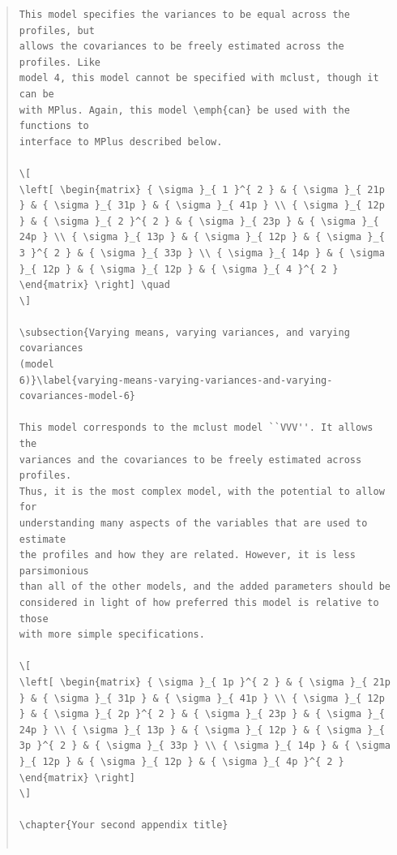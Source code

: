 \documentclass[]{msu-thesis}
\theoremstyle{definition}
\theoremstyle{definition}
\theoremstyle{definition}
\theoremstyle{remark}
\begin{document}
\begin{quote}
\begin{lstlisting}
This model specifies the variances to be equal across the profiles, but
allows the covariances to be freely estimated across the profiles. Like
model 4, this model cannot be specified with mclust, though it can be
with MPlus. Again, this model \emph{can} be used with the functions to
interface to MPlus described below.

\[
\left[ \begin{matrix} { \sigma }_{ 1 }^{ 2 } & { \sigma }_{ 21p } & { \sigma }_{ 31p } & { \sigma }_{ 41p } \\ { \sigma }_{ 12p } & { \sigma }_{ 2 }^{ 2 } & { \sigma }_{ 23p } & { \sigma }_{ 24p } \\ { \sigma }_{ 13p } & { \sigma }_{ 12p } & { \sigma }_{ 3 }^{ 2 } & { \sigma }_{ 33p } \\ { \sigma }_{ 14p } & { \sigma }_{ 12p } & { \sigma }_{ 12p } & { \sigma }_{ 4 }^{ 2 } \end{matrix} \right] \quad
\]

\subsection{Varying means, varying variances, and varying covariances
(model
6)}\label{varying-means-varying-variances-and-varying-covariances-model-6}

This model corresponds to the mclust model ``VVV''. It allows the
variances and the covariances to be freely estimated across profiles.
Thus, it is the most complex model, with the potential to allow for
understanding many aspects of the variables that are used to estimate
the profiles and how they are related. However, it is less parsimonious
than all of the other models, and the added parameters should be
considered in light of how preferred this model is relative to those
with more simple specifications.

\[
\left[ \begin{matrix} { \sigma }_{ 1p }^{ 2 } & { \sigma }_{ 21p } & { \sigma }_{ 31p } & { \sigma }_{ 41p } \\ { \sigma }_{ 12p } & { \sigma }_{ 2p }^{ 2 } & { \sigma }_{ 23p } & { \sigma }_{ 24p } \\ { \sigma }_{ 13p } & { \sigma }_{ 12p } & { \sigma }_{ 3p }^{ 2 } & { \sigma }_{ 33p } \\ { \sigma }_{ 14p } & { \sigma }_{ 12p } & { \sigma }_{ 12p } & { \sigma }_{ 4p }^{ 2 } \end{matrix} \right]
\]

\chapter{Your second appendix title}


\end{lstlisting}
\end{quote}
\end{document}
